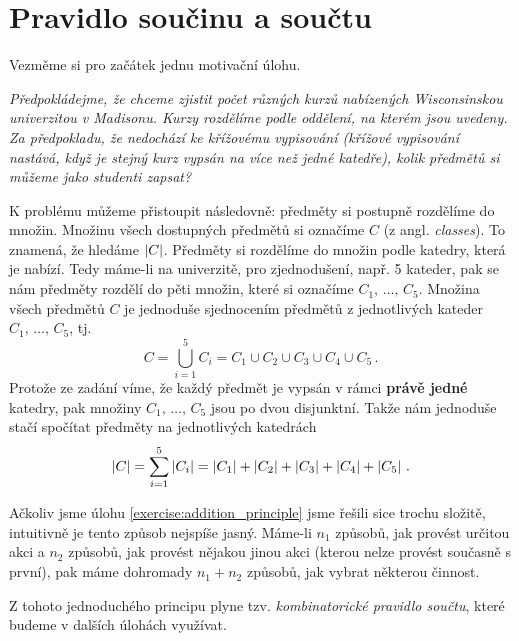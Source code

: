 \section{Pravidlo součinu a součtu}

Vezměme si pro začátek jednu motivační úlohu.

\begin{exercise}
    \textit{Předpokládejme, že chceme zjistit počet různých kurzů nabízených Wisconsinskou univerzitou v Madisonu. Kurzy rozdělíme podle oddělení, na kterém jsou uvedeny. Za předpokladu, že nedochází ke křížovému vypisování (křížové vypisování nastává, když je stejný kurz vypsán na více než jedné katedře), kolik předmětů si můžeme jako studenti zapsat?} \citep[str. 28]{Brualdi2018}
\end{exercise}

\begin{solution}\label{exercise:addition_principle}
    K problému můžeme přistoupit následovně: předměty si postupně rozdělíme do množin. Množinu všech dostupných předmětů si označíme $C$ (z angl. \emph{classes}). To znamená, že hledáme $\left| C \right|$. Předměty si rozdělíme do množin podle katedry, která je nabízí. Tedy máme-li na univerzitě, pro zjednodušení, např. 5 kateder, pak se nám předměty rozdělí do pěti množin, které si označíme $C_1,\,\dots,\, C_5$. Množina všech předmětů $C$ je jednoduše sjednocením předmětů z jednotlivých kateder $C_1,\,\dots,\, C_5$, tj.
    \begin{equation*}
        C=\bigcup\limits_{i=1}^{5}C_i=C_1\cup C_2\cup C_3\cup C_4\cup C_5\,.
    \end{equation*}
    Protože ze zadání víme, že každý předmět je vypsán v rámci \textbf{právě jedné} katedry, pak množiny $C_1,\,\dots,\, C_5$ jsou po dvou disjunktní. Takže nám jednoduše stačí spočítat předměty na jednotlivých katedrách
    \begin{equation*}
        \left| C \right|=\sum_{i=1}^{5}\left| C_i \right|=\left| C_1 \right|+\left| C_2 \right|+\left| C_3 \right|+\left| C_4 \right|+\left| C_5 \right|\,.
    \end{equation*}
\end{solution}

Ačkoliv jsme úlohu \ref{exercise:addition_principle} jsme řešili sice trochu složitě, intuitivně je tento způsob nejspíše jasný. Máme-li $n_1$ způsobů, jak provést určitou akci a $n_2$ způsobů, jak provést nějakou jinou akci (kterou nelze provést současně s první), pak máme dohromady $n_1+n_2$ způsobů, jak vybrat některou činnost.\par
Z tohoto jednoduchého principu plyne tzv. \emph{kombinatorické pravidlo součtu}, které budeme v dalších úlohách využívat.

